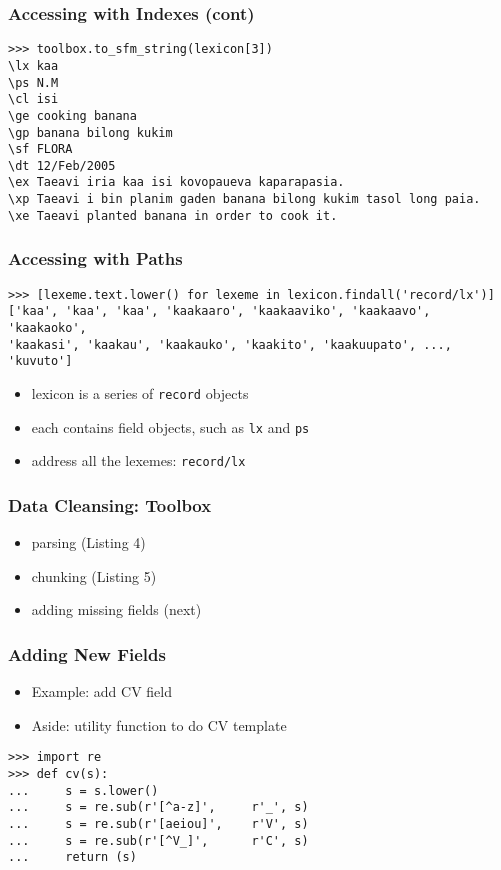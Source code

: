 \documentclass{beamer}             %
\begin{document}
\begin{frame}[fragile]
\frametitle{Accessing with Indexes (cont)}

\scriptsize
\begin{verbatim}
>>> toolbox.to_sfm_string(lexicon[3])
\lx kaa
\ps N.M
\cl isi
\ge cooking banana
\gp banana bilong kukim
\sf FLORA
\dt 12/Feb/2005
\ex Taeavi iria kaa isi kovopaueva kaparapasia.
\xp Taeavi i bin planim gaden banana bilong kukim tasol long paia.
\xe Taeavi planted banana in order to cook it.
\end{verbatim}
\end{frame}

\begin{frame}[fragile]
\frametitle{Accessing with Paths}

\scriptsize
\begin{verbatim}
>>> [lexeme.text.lower() for lexeme in lexicon.findall('record/lx')]
['kaa', 'kaa', 'kaa', 'kaakaaro', 'kaakaaviko', 'kaakaavo', 'kaakaoko',
'kaakasi', 'kaakau', 'kaakauko', 'kaakito', 'kaakuupato', ..., 'kuvuto']
\end{verbatim}

\small
\begin{itemize}
\item lexicon is a series of \texttt{record} objects
\item each contains field objects, such as \texttt{lx} and \texttt{ps}
\item address all the lexemes: \texttt{record/lx}
\end{itemize}

\end{frame}

\begin{frame}
\frametitle{Data Cleansing: Toolbox}

\begin{itemize}
\item parsing (Listing 4)
\item chunking (Listing 5)
\item adding missing fields (next)
\end{itemize}
\end{frame}

\begin{frame}[fragile]
\frametitle{Adding New Fields}
\small

\begin{itemize}
\item Example: add CV field
\item Aside: utility function to do CV template
\end{itemize}

\begin{verbatim}
>>> import re
>>> def cv(s):
...     s = s.lower()
...     s = re.sub(r'[^a-z]',     r'_', s)
...     s = re.sub(r'[aeiou]',    r'V', s)
...     s = re.sub(r'[^V_]',      r'C', s)
...     return (s)
\end{verbatim}
\end{frame}
\end{document}
